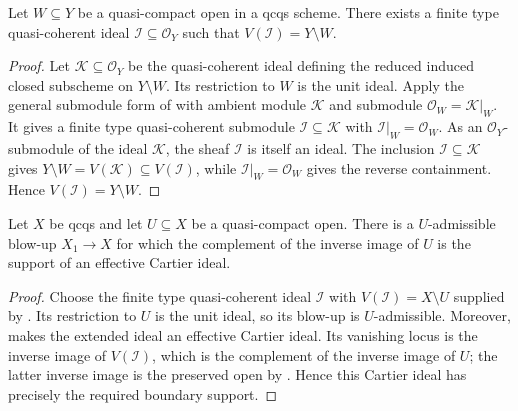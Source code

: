 \begin{lemma}
  \label{lemma:nagata-qc-open-complement-ideal-exists}
  \leanok

  Let $W\subseteq Y$ be a quasi-compact open in a qcqs scheme.  There exists
  a finite type quasi-coherent ideal $\mathcal I\subseteq\mathcal O_Y$ such
  that $V(\mathcal I)=Y\setminus W$.
\end{lemma}

\begin{proof}
  \leanok
  Let $\mathcal K\subseteq\mathcal O_Y$ be the quasi-coherent ideal defining
  the reduced induced closed subscheme on $Y\setminus W$.  Its restriction to
  $W$ is the unit ideal.  Apply the general submodule form of
   with ambient module
  $\mathcal K$ and submodule $\mathcal O_W=\mathcal K|_W$.  It gives a finite
  type quasi-coherent submodule $\mathcal I\subseteq\mathcal K$ with
  $\mathcal I|_W=\mathcal O_W$.  As an $\mathcal O_Y$-submodule of the ideal
  $\mathcal K$, the sheaf $\mathcal I$ is itself an ideal.
  The inclusion $\mathcal I\subseteq\mathcal K$ gives
  $Y\setminus W=V(\mathcal K)\subseteq V(\mathcal I)$, while
  $\mathcal I|_W=\mathcal O_W$ gives the reverse containment.  Hence
  $V(\mathcal I)=Y\setminus W$.
\end{proof}

\begin{lemma}
  \label{lemma:nagata-cartier-boundary-preparation}
  \leanok

  Let $X$ be qcqs and let $U\subseteq X$ be a quasi-compact open.  There is a
  $U$-admissible blow-up $X_1\to X$ for which the complement of the inverse
  image of $U$ is the support of an effective Cartier ideal.
\end{lemma}

\begin{proof}
  \leanok
  Choose the finite type quasi-coherent ideal $\mathcal I$ with
  $V(\mathcal I)=X\setminus U$ supplied by
  .  Its restriction to
  $U$ is the unit ideal, so its blow-up is $U$-admissible.  Moreover,
   makes the extended ideal an
  effective Cartier ideal.  Its vanishing locus is the inverse image of
  $V(\mathcal I)$, which is the complement of the inverse image of $U$;
  the latter inverse image is the preserved open by
  .  Hence this Cartier ideal has
  precisely the required boundary support.
\end{proof}

